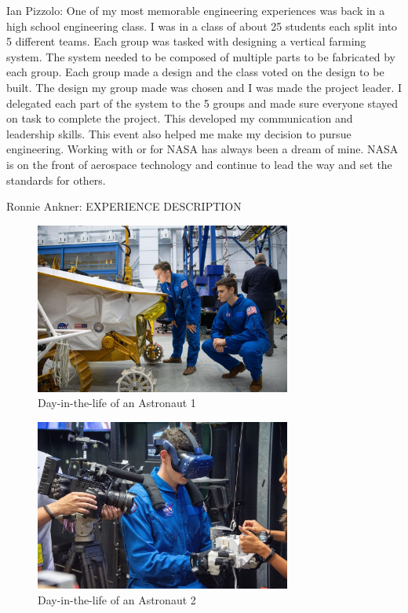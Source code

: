 \documentclass{article}
\begin{document}
Ian Pizzolo: One of my most memorable engineering experiences was back in a high school engineering class. I was in a class of about 25 students each split into 5 different teams. Each group was tasked with designing a vertical farming system. The system needed to be composed of multiple parts to be fabricated by each group. Each group made a design and the class voted on the design to be built. The design my group made was chosen and I was made the project leader. I delegated each part of the system to the 5 groups and made sure everyone stayed on task to complete the project. This developed my communication and leadership skills. This event also helped me make my decision to pursue engineering. Working with or for NASA has always been a dream of mine. NASA is on the front of aerospace technology and continue to lead the way and set the standards for others.

Ronnie Ankner: EXPERIENCE DESCRIPTION

\begin{figure}[!htb]
  \centering
  \includegraphics[width=0.75\textwidth]{assets/staringatrover.jpg}
  \caption{Day-in-the-life of an Astronaut 1}
  \label{fig:staringatrover}
\end{figure}

\begin{figure}[!htb]
  \centering
  \includegraphics[width=0.75\textwidth]{assets/vrtest.png}
  \caption{Day-in-the-life of an Astronaut 2}
  \label{fig:vrtest}
\end{figure}
\end{document}
